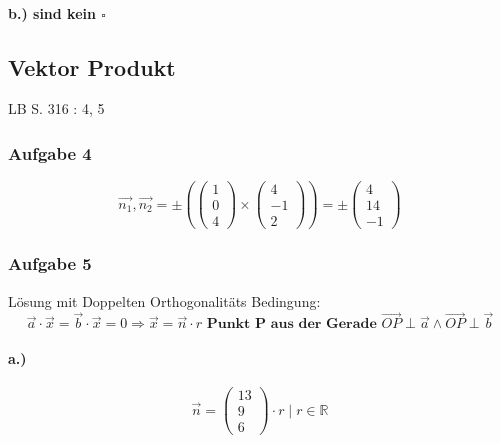 \documentclass{article}
\begin{document}
\paragraph*{b.) 
sind kein \( \square \)} 

\subsection*{Vektor Produkt}

LB S. 316 : 4, 5

\subsubsection*{Aufgabe 4}

\begin{equation}
	\overrightarrow{n_1}, \overrightarrow{n_2} =  \pm ( \begin{pmatrix}1\\0\\4\end{pmatrix} \times \begin{pmatrix}4\\-1\\2\end{pmatrix} ) = \pm \begin{pmatrix}4\\14\\-1\end{pmatrix}
\end{equation}

\subsubsection*{Aufgabe 5}

Lösung mit Doppelten Orthogonalitäts Bedingung:
\begin{equation}
	\overrightarrow{a} \cdot \overrightarrow{x} = \overrightarrow{b} \cdot \overrightarrow{x} = 0 \Rightarrow  \overrightarrow{x} = \overrightarrow{n} \cdot r  \textbf{ Punkt P aus der Gerade } \overrightarrow{OP} \perp \overrightarrow{a} \wedge \overrightarrow{OP} \perp \overrightarrow{b} 
\end{equation}

\paragraph*{a.)}

\begin{equation}
	\overrightarrow{n} = \begin{pmatrix}13\\9\\6\end{pmatrix} \cdot r \mid r \in \mathbb{R}
\end{equation}
\end{document}
